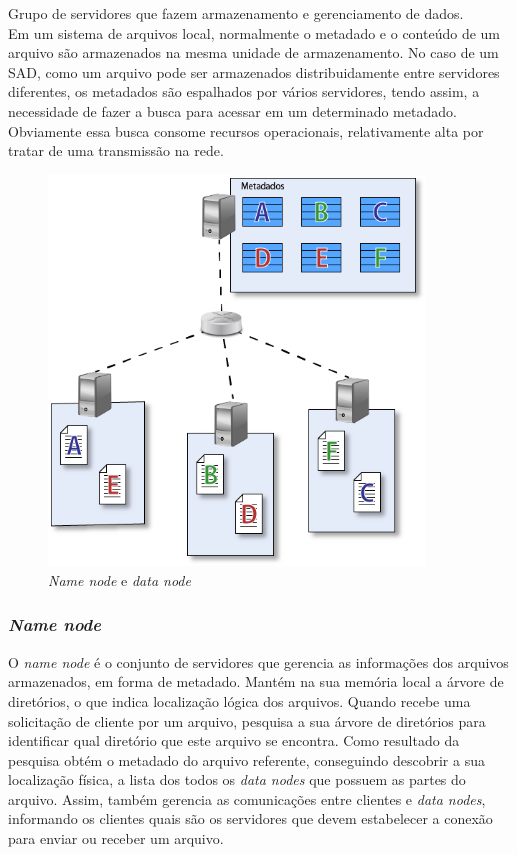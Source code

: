 	Grupo de servidores que fazem armazenamento e gerenciamento de dados. \\
	
	Em um sistema de arquivos local, normalmente o metadado e o conteúdo de um arquivo são armazenados na mesma unidade de armazenamento. No caso de um SAD, como um arquivo pode ser armazenados distribuidamente entre servidores diferentes, os metadados são espalhados por vários servidores, tendo assim, a necessidade de fazer a busca para acessar em um determinado metadado. Obviamente essa busca consome recursos operacionais, relativamente alta por tratar de uma transmissão na rede.   
	\begin{figure}[htb]
		\begin{center}
			
			\includegraphics[clip,width=10.0cm]{images/image7.png}
			\caption{\textit{Name node} e \textit{data node}}
			\label{fig:namenode}
		\end{center}
	\end{figure}
	
	\subsubsection{\textit{Name node}}
	
	O \textit{name node} é o conjunto de servidores que gerencia as informações dos arquivos armazenados, em forma de metadado.
	Mantém na sua memória local a árvore de diretórios, o que indica localização lógica dos arquivos. Quando recebe uma solicitação de cliente por um arquivo, pesquisa a sua árvore de diretórios para identificar qual diretório que este arquivo se encontra. Como resultado da pesquisa obtém o metadado do arquivo referente, conseguindo descobrir a sua localização física, a lista dos todos os \textit{data nodes} que possuem as partes do arquivo. Assim, também gerencia as comunicações entre clientes e \textit{data nodes}, informando os clientes quais são os servidores que devem estabelecer a conexão para enviar ou receber um arquivo. 
	\\
	
